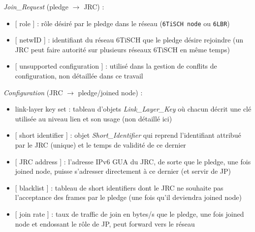 \documentclass[]{report}
\begin{document}
\vspace{0.2cm}
\noindent\textit{Join\_Request} (pledge $\rightarrow$ JRC) : 
\begin{itemize}[label=$\bullet$]
\item {} [ role ] : rôle désiré par le pledge dans le réseau (\texttt{6TiSCH node} ou \texttt{6LBR})
\item {} [ netwID ] : identifiant du réseau 6TiSCH que le pledge désire rejoindre (un JRC peut faire autorité sur plusieurs réseaux 6TiSCH en même temps)
\item {} [ unsupported configuration ] : utilisé dans la gestion de conflits de configuration, non détaillée dans ce travail
\end{itemize}

\vspace{0.3cm}
\noindent\textit{Configuration} (JRC $\rightarrow$ pledge/joined node) : 
\begin{itemize}[label=$\bullet$]
\item link-layer key set : tableau d'objets \textit{Link\_Layer\_Key} où chacun décrit une clé utilisée au niveau lien et son usage (non détaillé ici)
\item {} [ short identifier ] : objet \textit{Short\_Identifier} qui reprend l'identifiant attribué par le JRC (unique) et le temps de validité de ce dernier
\item {} [ JRC address ] : l'adresse IPv6 GUA du JRC, de sorte que le pledge, une fois joined node, puisse s'adresser directement à ce dernier (et servir de JP)
\item {} [ blacklist ] : tableau de short identifiers dont le JRC ne souhaite pas l'acceptance des frames par le pledge (une fois qu'il deviendra joined node)
\item {} [ join rate ] : taux de traffic de join en bytes/s que le pledge, une fois joined node et endossant le rôle de JP, peut forward vers le réseau
\end{itemize}

\newpage
\end{document}
